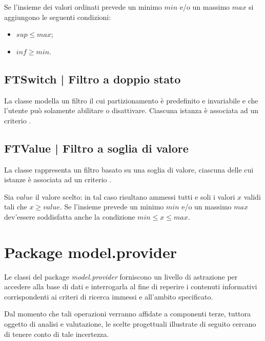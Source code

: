 \documentclass[10pt,a4paper,headinclude,footinclude,hidelinks]{scrreprt} %
\begin{document}
	Se l'insieme dei valori ordinati prevede un minimo $min$ e/o un massimo $max$ si aggiungono le seguenti condizioni:
	\begin{itemize}
	\item $sup \leq max$;
	\item $inf \geq min$.
	\end{itemize}

	\subsection[FTSwitch]{FTSwitch | Filtro a doppio stato}
	\label{sec:stage:design:sistema:model.filter:switch-filter}
	La classe \textit{} modella un filtro il cui partizionamento è predefinito e invariabile e che l'utente può solamente abilitare o disattivare. Ciascuna istanza è associata ad un criterio \textit{}.

	\subsection[FTValue]{FTValue | Filtro a soglia di valore}
	\label{sec:stage:design:sistema:model.filter:value-filter}
	La classe \textit{} rappresenta un filtro basato su una soglia di valore, ciascuna delle cui istanze è associata ad un criterio \textit{}.

	Sia $value$ il valore scelto: in tal caso risultano ammessi tutti e soli i valori $x$ validi tali che $x \geq value$. Se l'insieme prevede un minimo $min$ e/o un massimo $max$ dev'essere soddisfatta anche la condizione $min \leq x \leq max$.

	\section{Package model.provider}
	\label{sec:stage:design:sistema:model.provider}
	Le classi del package \textit{model.provider} forniscono un livello di astrazione per accedere alla base di dati e interrogarla al fine di reperire i contenuti informativi corrispondenti ai criteri di ricerca immessi e all'ambito specificato.

	Dal momento che tali operazioni verranno affidate a componenti terze, tuttora oggetto di analisi e valutazione, le scelte progettuali illustrate di seguito cercano di tenere conto di tale incertezza.
\end{document}

